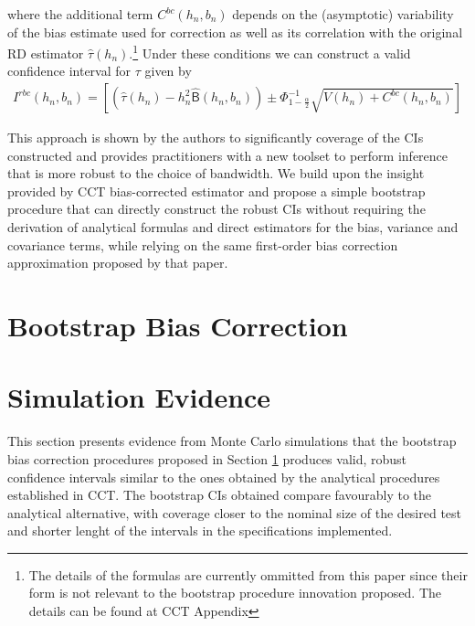 \documentclass[12pt,fleqn]{article}
\begin{document}
where the additional term $C^{bc}(h_{n}, b_{n})$ depends on the (asymptotic) 
variability of the bias estimate used for correction as well as its correlation 
with the original RD estimator $\hat{\tau}(h_{n})$.\footnote{The details of the 
formulas are currently ommitted from this paper since their form is not relevant
to the bootstrap procedure innovation proposed. The details can be found at 
CCT Appendix}  Under these conditions we can construct a valid 
confidence interval for $\tau$ given by
 \begin{align}
  I^{rbc}(h_{n}, b_{n})=\left[\left(\hat{\tau}(h_{n})-h_{n}^{2}\hat{\mathsf{B}}
  (h_{n},b_{n})\right)\pm \Phi^{-1}_{1-\frac{\alpha}{2}}\sqrt{V(h_{n})+C^{bc}
  (h_{n}, b_{n})} \right]
 \end{align}

This approach is shown by the authors to significantly coverage of the CIs 
constructed and provides practitioners with a new toolset to perform inference 
that is more robust to the choice of bandwidth. We build upon the insight 
provided by CCT bias-corrected estimator and propose a simple 
bootstrap procedure that can directly construct the robust CIs without requiring
the derivation of analytical formulas and direct estimators for the bias, 
variance and covariance terms, while relying on the same first-order bias 
correction approximation proposed by that paper.

\section{Bootstrap Bias Correction}\label{boot}

\section{Simulation Evidence}\label{sim}
This section presents evidence from Monte Carlo simulations that the bootstrap 
bias correction procedures proposed in Section \ref{boot} produces valid, robust
confidence intervals similar to the ones obtained by the analytical procedures 
established in CCT. The bootstrap CIs obtained compare favourably
to the analytical alternative, with coverage closer to the nominal size of the 
desired test and shorter lenght of the intervals in the specifications implemented.
\end{document}
